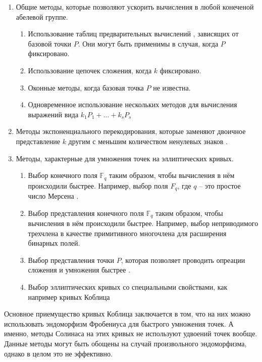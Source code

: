 \documentclass[a4paper,12pt]{article}
\theoremstyle{definition}
\begin{document}
	\begin{enumerate}
		\item Общие методы, которые позволяют ускорить вычисления в любой конеченой абелевой группе.
			\begin{enumerate}
				\item Использование таблиц предварительных вычислений \cite{lim1994more}, зависящих от базовой точки $P$. Они могут быть применимы в случая, когда $P$ фиксировано.
				\item Использование цепочек сложения, когда $k$ фиксировано.
				\item Оконные методы, когда базовая точка $P$ не известна.
				\item Одновременное использование нескольких методов для вычисления выражений вида $k_1 P_1 + \ldots + k_s P_s$
			\end{enumerate}

		\item Методы экспоненциального перекодирования, которые заменяют двоичное представление $k$ другим с меньшим количеством ненулевых знаков \cite{gollmann1996redundant}.
		
		\item Методы, характерные для умножения точек на эллиптических кривых.
			\begin{enumerate}
				\item Выбор конечного поля $\mathbb{F}_q$ таким образом, чтобы вычисления в нём происходили быстрее. Например, выбор поля $F_q$, где $q$ -- это простое число Мерсена \cite{solinas1999generalized}.
				\item Выбор представления конечного поля $\mathbb{F}_q$ таким образом, чтобы вычисления в нём происходили быстрее. Например, выбор неприводимого трехчлена в качестве примитивного многочлена для расширения бинарных полей.
				\item Выбор представления точки $P$, которая позволяет проводить опреации сложения и умножения быстрее \cite{cohen1998efficient}.
				\item Выбор эллиптических кривых со специальными свойствами, как например кривых Коблица \cite{koblitz1991cm}
			\end{enumerate}
	\end{enumerate}

	Основное приемущество кривых Коблица заключается в том, что на них можно использовать эндоморфизм Фробениуса для быстрого умножения точек. А именно, методы Солинаса \cite{solinas1997improved, solinas2000efficient} на этих кривых не используют удвоений точек вообще. Данные методы могут быть обощены на случай произвольного эндоморфизма, однако в целом это не эффективно.
	
\end{document}
